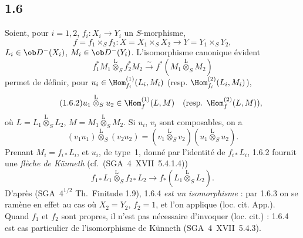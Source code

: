 \subsection*{1.6}
Soient, pour $i=1,2$, $f_i:X_i\to Y_i$ un $S$-morphisme,
\[
f=f_1\times_S f_2:X=X_1\times_S X_2\to Y=Y_1\times_S Y_2,
\]
$L_i\in\ob D^{-}(X_i)$, $M_i\in\ob D^{-}(Y_i)$. L'isomorphisme canonique évident
\begin{equation}\tag{1.6.1}
f_1^{*}M_1\overset{\mathrm{L}}{\otimes}_{S}f_2^{*}M_2\xrightarrow{\sim}f^{*}(M_1\overset{\mathrm{L}}{\otimes}_{S}M_2)
\end{equation}
permet de définir, pour $u_i\in\Hom_{f_i}^{(1)}(L_i,M_i)$ (resp. $\Hom_{f_i}^{(2)}(L_i,M_i)$),
\begin{equation}\tag{1.6.2}
u_1\overset{\mathrm{L}}{\otimes}_{S}u_2\in\Hom_{f}^{(1)}(L,M)\quad(\text{resp. }\Hom_f^{(2)}(L,M)),
\end{equation}
où $L=L_1\overset{\mathrm{L}}{\otimes}_{S}L_2$, $M=M_1\overset{\mathrm{L}}{\otimes}_{S}M_2$. Si $u_i$, $v_i$ sont composables, on a
\begin{equation}\tag{1.6.3}
(v_1u_1)\overset{\mathrm{L}}{\otimes}_{S}(v_2u_2)=(v_1\overset{\mathrm{L}}{\otimes}_{S}v_2)(u_1\overset{\mathrm{L}}{\otimes}_{S}u_2).
\end{equation}
Prenant $M_i=f_{i*}L_i$, et $u_i$, de type~1, donné par l'identité de $f_{i*}L_i$, 1.6.2 fournit une \emph{flèche de Künneth} (cf.~(SGA~4~XVII~5.4.1.4))
\begin{equation}\tag{1.6.4}
f_{1*}L_1\overset{\mathrm{L}}{\otimes}_{S}f_{2*}L_2\longrightarrow f_{*}(L_1\overset{\mathrm{L}}{\otimes}_{S}L_2).
\end{equation}
D'après (SGA~$4^{1/2}$ Th.~Finitude 1.9), 1.6.4 \emph{est un isomorphisme} : par 1.6.3 on se ramène en effet au cas où $X_2=Y_2$, $f_2=1$, et l'on applique (loc. cit. App.). Quand $f_1$ et $f_2$ sont propres, il n'est pas nécessaire d'invoquer (loc. cit.) : 1.6.4 est cas particulier de l'isomorphisme de Künneth (SGA~4~XVII~5.4.3).

